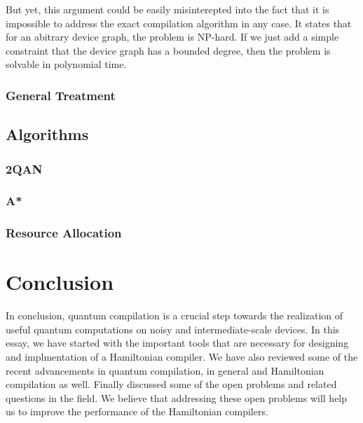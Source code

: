 \documentclass{report}
\begin{document}
But yet, this argument could be easily misinterepted into the fact that it is impossible to address the exact compilation algorithm in any case. It states that for an abitrary device graph, the problem is NP-hard. If we just add a simple constraint that the device graph has a bounded degree, then the problem is solvable in polynomial time. \cite{?}

\subsection{General Treatment}

\section{Algorithms}
\subsection{2QAN}
\subsection{A*}
\subsection{Resource Allocation}



\chapter{Conclusion}\label{chap:conclusion}

In conclusion, quantum compilation is a crucial step towards the realization of useful quantum computations on noisy and intermediate-scale devices. In this essay, we have started with the important tools that are necessary for designing and implmentation of a Hamiltonian compiler. We have also reviewed some of the recent advancements in quantum compilation, in general and Hamiltonian compilation as well. Finally discussed some of the open problems and related questions in the field. We believe that addressing these open problems will help us to improve the performance of the Hamiltonian compilers.

\printbibliography
\end{document}
